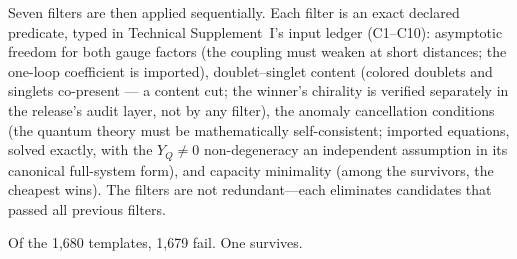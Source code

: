 \documentclass[11pt]{article}
\begin{document}
Seven filters are then applied sequentially.  Each filter is an exact declared predicate, typed in Technical Supplement~I's input ledger (C1--C10): asymptotic freedom for both gauge factors (the coupling must weaken at short distances; the one-loop coefficient is imported), doublet--singlet content (colored doublets and singlets co-present --- a content cut; the winner's chirality is verified separately in the release's audit layer, not by any filter), the anomaly cancellation conditions (the quantum theory must be mathematically self-consistent; imported equations, solved exactly, with the $Y_Q \neq 0$ non-degeneracy an independent assumption in its canonical full-system form), and capacity minimality (among the survivors, the cheapest wins).  The filters are not redundant---each eliminates candidates that passed all previous filters.

Of the 1{,}680 templates, 1{,}679 fail.  One survives.
\end{document}
